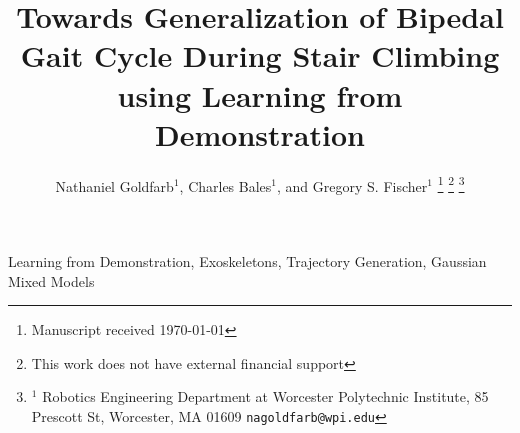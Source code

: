 \documentclass[conference]{IEEEtran}
\begin{document}
\title{Towards Generalization of Bipedal Gait Cycle During Stair Climbing using Learning from Demonstration}


\author{Nathaniel Goldfarb$^{1}$, Charles Bales$^{1}$, and Gregory S. Fischer$^{1} $ %
\thanks{Manuscript received \today}%
\thanks{This work does not have external financial support}%
\thanks{$^{1}$ Robotics Engineering Department at Worcester Polytechnic Institute, 85 Prescott St, Worcester, MA 01609 {\tt\small nagoldfarb@wpi.edu}}%

}

\maketitle


\begin{abstract}
   
\end{abstract}
\begin{IEEEkeywords}
Learning from Demonstration, Exoskeletons, Trajectory Generation,  Gaussian Mixed Models
\end{IEEEkeywords}
%
%


%











\end{document}
